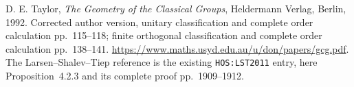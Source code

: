 D. E. Taylor, \emph{The Geometry of the Classical Groups},
Heldermann Verlag, Berlin, 1992. Corrected author version,
unitary classification and complete order calculation pp.~115--118;
finite orthogonal classification and complete order calculation
pp.~138--141.
\url{https://www.maths.usyd.edu.au/u/don/papers/gcg.pdf}.
The Larsen--Shalev--Tiep reference is the existing
\texttt{HOS:LST2011} entry, here Proposition~4.2.3 and its complete
proof pp.~1909--1912.
